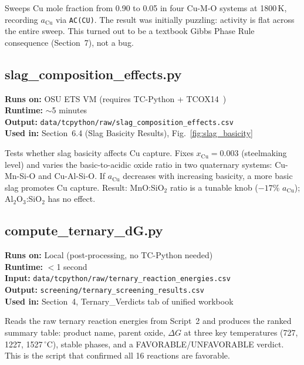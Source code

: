 \documentclass[11pt]{article}
\begin{document}
Sweeps Cu mole fraction from 0.90 to 0.05 in four Cu-M-O systems at 1800\,K, recording $a_{\text{Cu}}$ via \texttt{AC(CU)}. The result was initially puzzling: activity is flat across the entire sweep. This turned out to be a textbook Gibbs Phase Rule consequence (Section~7), not a bug.



\cleardoublepage
\subsection{slag\_composition\_effects.py}
\label{script:slag_effects}

\textbf{Runs on:} OSU ETS VM (requires TC-Python + TCOX14~\cite{TCOX14})\\
\textbf{Runtime:} $\sim$5 minutes\\
\textbf{Output:} \texttt{data/tcpython/raw/slag\_composition\_effects.csv}\\
\textbf{Used in:} Section~6.4 (Slag Basicity Results), Fig.~\ref{fig:slag_basicity}

Tests whether slag basicity affects Cu capture. Fixes $x_{\text{Cu}} = 0.003$ (steelmaking level) and varies the basic-to-acidic oxide ratio in two quaternary systems: Cu-Mn-Si-O and Cu-Al-Si-O. If $a_{\text{Cu}}$ decreases with increasing basicity, a more basic slag promotes Cu capture. Result: MnO:SiO$_2$ ratio is a tunable knob ($-17$\% $a_{\text{Cu}}$); Al$_2$O$_3$:SiO$_2$ has no effect.



\cleardoublepage
\subsection{compute\_ternary\_dG.py}
\label{script:compute_ternary}

\textbf{Runs on:} Local (post-processing, no TC-Python needed)\\
\textbf{Runtime:} $<$1 second\\
\textbf{Input:} \texttt{data/tcpython/raw/ternary\_reaction\_energies.csv}\\
\textbf{Output:} \texttt{screening/ternary\_screening\_results.csv}\\
\textbf{Used in:} Section~4, Ternary\_Verdicts tab of unified workbook

Reads the raw ternary reaction energies from Script~2 and produces the ranked summary table: product name, parent oxide, $\Delta G$ at three key temperatures (727, 1227, 1527\,$^\circ$C), stable phases, and a FAVORABLE/UNFAVORABLE verdict. This is the script that confirmed all 16 reactions are favorable.
\end{document}
